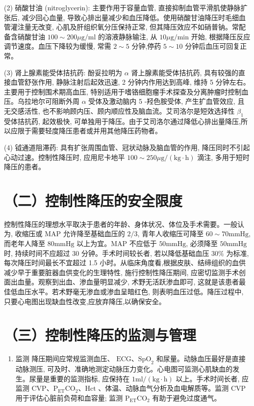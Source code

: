 \documentclass[10pt]{article}
\begin{document}
(2) 硝酸甘油 (nitroglycerin): 主要作用于容量血管, 直接抑制血管平滑肌使静脉扩张后, 减少回心血量, 导致心排出量减少和血压降低。使用硝酸甘油降压时毛细血管灌注量无改变, 心肌及肝组织氧分压保持正常, 但其降压效应不如硝普钠。常配备含硝酸甘油 $100 \sim 200 \mu \mathrm{g} / \mathrm{ml}$ 的溶液静脉输注, 从 $10 \mu \mathrm{g} / \mathrm{min}$ 开始, 根据降压反应调节速度。血压下降较为缓慢, 常需 $2 \sim 5$ 分钟,停药 $5 \sim 10$ 分钟后血压可回复正常。

(3) 肾上腺素能受体拮抗药: 酚妥拉明为 $\alpha$ 肾上腺素能受体拮抗药, 具有较强的直接血管舒张作用, 静脉注射后起效迅速, 2 分钟内作用达到高峰, 维持 5 分钟左右。主要用于控制围术期高血压, 特别适用于嗜铬细胞瘤手术探查及分离肿瘤时控制血压。乌拉地尔可阻断外周 $\alpha$ 受体及激动脑内 5 -羟色胺受体, 产生扩血管效应, 且无交感活性, 也不影响顾内压、顾内顺应性及脑血流。艾司洛尔是短效选择性 $\beta_{1}$ 受体拮抗药, 起效极快, 可单独用于降压。由于艾司洛尔通过降低心排出量降压,所以应限于需要轻度降压患者或并用其他降压药物者。

(4) 钺通道阻滞药: 具有扩张周围血管、冠状动脉及脑血管的作用, 降压同时不引起心动过速。控制性降压时, 应用尼卡地平 $100 \sim 250 \mu \mathrm{g} /(\mathrm{kg} \cdot \mathrm{h})$ 滴注, 多用于短时降压的患者。

\section*{（二）控制性降压的安全限度}
控制性降压的理想水平取决于患者的年龄、身体状况、体位及手术需要。一般认为, 收缩压或 MAP 允许降至基础血压的 $2 / 3$, 青年人收缩压可降至 $60 \sim 70 \mathrm{mmHg}$, 而老年人降至 $80 \mathrm{mmHg}$ 以上为宜。MAP 不应低于 $50 \mathrm{mmHg}$, 必须降至 $50 \mathrm{mmHg}$ 时, 持续时间不应超过 30 分钟。手术时间较长者, 若以降低基础血压 $30 \%$ 为标准, 每次降压时间最长不宜超过 1.5 小时。从临床角度看,根据皮肤、结缔组织的血供减少早于重要脏器血供变化的生理特性, 施行控制性降压期间, 应密切监测手术创面出血量。观察到出血、渗血量明显减少, 术野无活跃渗血即可, 这就是该患者最佳低血压水平。若术野毫无渗血或渗血呈暗红色, 则表明血压过低。降压过程中, 只要心电图出现缺血性改变,应放弃降压,以确保安全。

\section*{（三）控制性降压的监测与管理}
\begin{enumerate}
  \item 监测 降压期间应常规监测血压、 $\mathrm{ECG} 、 \mathrm{SpO}_{2}$ 和尿量。动脉血压最好是直接动脉测压, 可及时、准确地测定动脉压力变化。心电图可监测心肌缺血的发生。尿量是重要的监测指标, 应保持在 $1 \mathrm{ml} /(\mathrm{kg} \cdot \mathrm{h})$ 以上。手术时间长者, 应监测 $\mathrm{CVP} 、 \mathrm{P}_{\mathrm{ET}} \mathrm{CO}_{2} 、 \mathrm{Hct}$ 、体温、动脉血气分析及血电解质等。监测 CVP 用于评估心脏前负荷和血容量; 监测 $\mathrm{P}_{\mathrm{ET}} \mathrm{CO}_{2}$ 有助于避免过度通气。
\end{enumerate}
\end{document}
